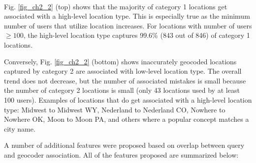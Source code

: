 \begin{figure*}[htp]
\centering
\\
   \caption[Category 1 vs. Category 2 ratio street-level]{\textbf{Top} -- Large ratio of Category 1 locations associated with a high-level address (as in city-level). \textbf{Bottom} -- Large ratio of Category 2 locations (impossible to geocode) are associated with low-level (as in street-level). The chart confirms that majority of properly geocoded locations are not at street-level.} \label{fig_ch2_2}
\end{figure*}

Fig. \ref{fig_ch2_2} (top) shows that the majority of category 1 locations get associated with a high-level location type. This is especially true as the minimum number of users that utilize location increases. For locations with number of users $\geq 100$, the high-level location type captures 99.6\% (843 out of 846) of category 1 locations. 

Conversely, Fig. \ref{fig_ch2_2} (bottom) shows inaccurately geocoded locations captured by category 2 are associated with low-level location type. The overall trend does not decrease, but the number of associated mistakes is small because the number of category 2 locations is small (only 43 locations used by at least 100 users). %
Examples of locations that do get associated with a high-level location type: Midwest to Midwest WY, Nederland to Nederland CO, Nowhere to Nowhere OK, Moon to Moon PA, and others where a popular concept matches a city name. 

A number of additional features were proposed based on overlap between query and geocoder association. All of the features proposed are summarized below:

